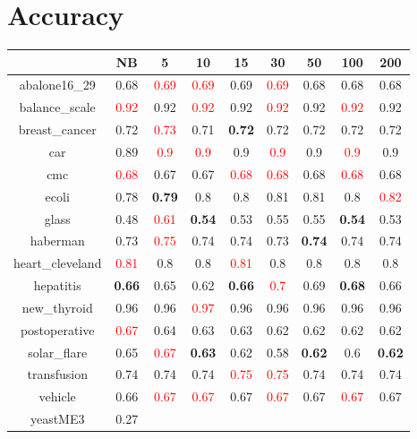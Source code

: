 \documentclass{article}%
\begin{document}
%
\normalsize%
\section*{Accuracy}%
\begin{tabular}{c|cccccccc}%
\hline%
&NB&5&10&15&30&50&100&200\\%
\hline%
abalone16\_29&0.68&\textcolor{red}{ 
0.69
}&\textcolor{red}{ 
0.69
}&0.69&\textcolor{red}{ 
0.69
}&0.68&0.68&0.68\\%
\hline%
balance\_scale&\textcolor{red}{ 
0.92
}&0.92&\textcolor{red}{ 
0.92
}&0.92&\textcolor{red}{ 
0.92
}&0.92&\textcolor{red}{ 
0.92
}&0.92\\%
\hline%
breast\_cancer&0.72&\textcolor{red}{ 
0.73
}&0.71&\textbf{0.72}&0.72&0.72&0.72&0.72\\%
\hline%
car&0.89&\textcolor{red}{ 
0.9
}&\textcolor{red}{ 
0.9
}&0.9&\textcolor{red}{ 
0.9
}&0.9&\textcolor{red}{ 
0.9
}&0.9\\%
\hline%
cmc&\textcolor{red}{ 
0.68
}&0.67&0.67&\textcolor{red}{ 
0.68
}&\textcolor{red}{ 
0.68
}&0.68&\textcolor{red}{ 
0.68
}&0.68\\%
\hline%
ecoli&0.78&\textbf{0.79}&0.8&0.8&0.81&0.81&0.8&\textcolor{red}{ 
0.82
}\\%
\hline%
glass&0.48&\textcolor{red}{ 
0.61
}&\textbf{0.54}&0.53&0.55&0.55&\textbf{0.54}&0.53\\%
\hline%
haberman&0.73&\textcolor{red}{ 
0.75
}&0.74&0.74&0.73&\textbf{0.74}&0.74&0.74\\%
\hline%
heart\_cleveland&\textcolor{red}{ 
0.81
}&0.8&0.8&\textcolor{red}{ 
0.81
}&0.8&0.8&0.8&0.8\\%
\hline%
hepatitis&\textbf{0.66}&0.65&0.62&\textbf{0.66}&\textcolor{red}{ 
0.7
}&0.69&\textbf{0.68}&0.66\\%
\hline%
new\_thyroid&0.96&0.96&\textcolor{red}{ 
0.97
}&0.96&0.96&0.96&0.96&0.96\\%
\hline%
postoperative&\textcolor{red}{ 
0.67
}&0.64&0.63&0.63&0.62&0.62&0.62&0.62\\%
\hline%
solar\_flare&0.65&\textcolor{red}{ 
0.67
}&\textbf{0.63}&0.62&0.58&\textbf{0.62}&0.6&\textbf{0.62}\\%
\hline%
transfusion&0.74&0.74&0.74&\textcolor{red}{ 
0.75
}&\textcolor{red}{ 
0.75
}&0.74&0.74&0.74\\%
\hline%
vehicle&0.66&\textcolor{red}{ 
0.67
}&\textcolor{red}{ 
0.67
}&0.67&\textcolor{red}{ 
0.67
}&0.67&\textcolor{red}{ 
0.67
}&0.67\\%
\hline%
yeastME3&0.27&\textcolor{red}{ 
}
\end{tabular}
\end{document}
